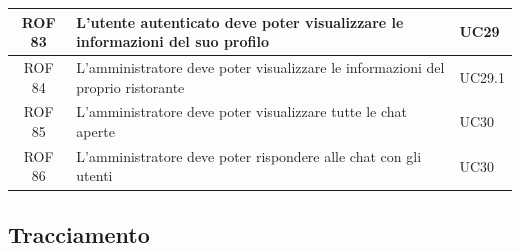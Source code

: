 \documentclass[12pt, oneside]{article}
\begin{document}
\begin{longtable}{|c|p{14cm}|p{2cm}|}
    \hline
    ROF 83 & L'utente autenticato deve poter visualizzare le informazioni del suo profilo & UC29 \\ 
    \hline
    ROF 84 & L'amministratore deve poter visualizzare le informazioni del proprio ristorante & UC29.1 \\
    \hline
    ROF 85 & L'amministratore deve poter visualizzare tutte le chat aperte & UC30 \\
    \hline
    ROF 86 & L'amministratore deve poter rispondere alle chat con gli utenti & UC30 \\
    \hline
\end{longtable}
\newpage

\setlength{\extrarowheight}{8pt}
\subsection{Tracciamento}
\end{document}
